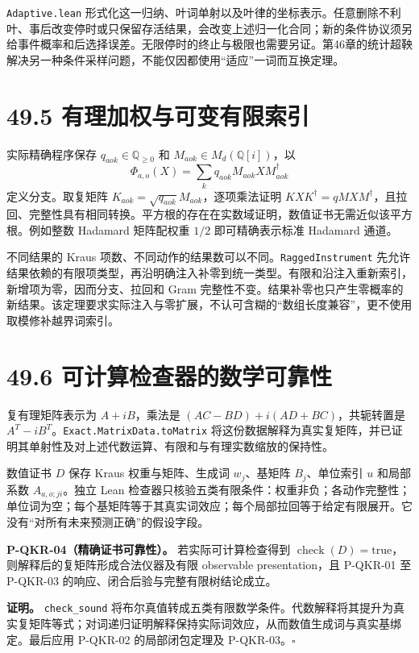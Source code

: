 \documentclass[
  11pt,
  oneside]{book}
\begin{document}
\texttt{Adaptive.\allowbreak lean}
形式化这一归纳、叶词单射以及叶律的坐标表示。任意删除不利叶、事后改变停时或只保留存活结果，会改变上述归一化合同；新的条件协议须另给事件概率和后选择误差。无限停时的终止与极限也需要另证。第46章的统计超鞅解决另一种条件采样问题，不能仅因都使用``适应''一词而互换定理。

\section{49.5 有理加权与可变有限索引}

实际精确程序保存 \(q_{aok}\in\mathbb Q_{\ge0}\) 和
\(M_{aok}\in M_d(\mathbb Q[i])\)，以 \[
\Phi_{a,o}(X)=\sum_kq_{aok}M_{aok}XM_{aok}^{\dagger}
\] 定义分支。取复矩阵 \(K_{aok}=\sqrt{q_{aok}}M_{aok}\)，逐项乘法证明
\(KXK^\dagger=qMXM^\dagger\)，且拉回、完整性具有相同转换。平方根的存在在实数域证明，数值证书无需近似该平方根。例如整数
Hadamard 矩阵配权重 \(1/2\) 即可精确表示标准 Hadamard 通道。

不同结果的 Kraus
项数、不同动作的结果数可以不同。\texttt{Ragged\allowbreak Instrument}
先允许结果依赖的有限项类型，再沿明确注入补零到统一类型。有限和沿注入重新索引，新增项为零，因而分支、拉回和
Gram
完整性不变。结果补零也只产生零概率的新结果。该定理要求实际注入与零扩展，不认可含糊的``数组长度兼容''，更不使用取模修补越界词索引。

\section{49.6 可计算检查器的数学可靠性}

复有理矩阵表示为 \(A+iB\)，乘法是 \((AC-BD)+i(AD+BC)\)，共轭转置是
\(A^T-iB^T\)。\texttt{Exact.\allowbreak Matrix\allowbreak Data.\allowbreak to\allowbreak Matrix}
将这份数据解释为真实复矩阵，并已证明其单射性及对上述代数运算、有限和与有理实数缩放的保持性。

数值证书 \(D\) 保存 Kraus 权重与矩阵、生成词 \(w_j\)、基矩阵
\(B_j\)、单位索引 \(u\) 和局部系数 \(A_{a,o;ji}\)。独立 Lean
检查器只核验五类有限条件：权重非负；各动作完整性；单位词为空；每个基矩阵等于其真实词效应；每个局部拉回等于给定有限展开。它没有``对所有未来预测正确''的假设字段。

\protect\hypertarget{p-qkr-04}{}{}

\textbf{P-QKR-04（精确证书可靠性）。} 若实际可计算检查得到
\(\operatorname{check}(D)=\mathrm{true}\)，则解释后的复矩阵形成合法仪器及有限
observable presentation，且 P-QKR-01 至 P-QKR-03
的响应、闭合后验与完整有限树结论成立。

\textbf{证明。} \texttt{check\_\allowbreak sound}
将布尔真值转成五类有限数学条件。代数解释将其提升为真实复矩阵等式；对词递归证明解释保持实际词效应，从而数值生成词与真实基绑定。最后应用
P-QKR-02 的局部闭包定理及 P-QKR-03。\(\square\)
\end{document}
